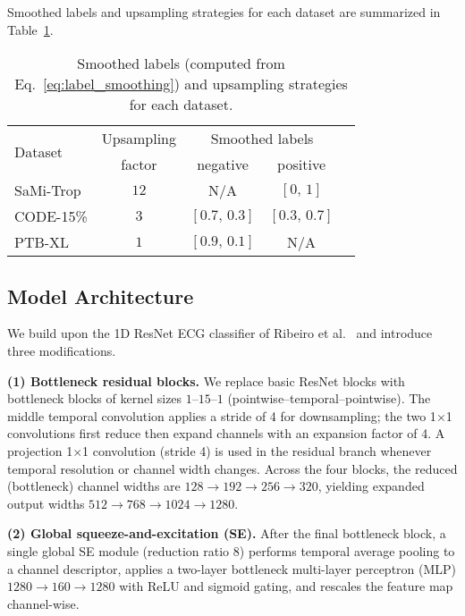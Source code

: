 \documentclass[twocolumn]{cinc}
\begin{document}
Smoothed labels and upsampling strategies for each dataset are summarized in Table~\ref{tab:augmentation}.


\begin{table}[!htp]
\centering
\begin{tabular}{lcccc}
\toprule
\multirow{2}{*}{Dataset} & Upsampling & \multicolumn{2}{c}{Smoothed labels} \\ \cmidrule(lr){3-4}
& factor & negative & positive \\
\midrule
SaMi-Trop & $12$ & N/A           & $[0,\,1]$     \\
CODE-15\% & $3$ & $[0.7,\,0.3]$ & $[0.3,\,0.7]$ \\
PTB-XL    & $1$ & $[0.9,\,0.1]$ & N/A           \\
\bottomrule
\end{tabular}
\caption{Smoothed labels (computed from Eq.~\ref{eq:label_smoothing}) and upsampling strategies for each dataset.}
\label{tab:augmentation}
\end{table}


\subsection{Model Architecture}
\label{subsec:model}


We build upon the 1D ResNet ECG classifier of Ribeiro et al.~\cite{ribeiro2020automatic} and introduce three modifications.

\textbf{(1) Bottleneck residual blocks.} We replace basic ResNet blocks with bottleneck blocks of kernel sizes $1$–$15$–$1$ (pointwise--temporal--pointwise). The middle temporal convolution applies a stride of 4 for downsampling; the two 1$\times$1 convolutions first reduce then expand channels with an expansion factor of 4. A projection 1$\times$1 convolution (stride 4) is used in the residual branch whenever temporal resolution or channel width changes. Across the four blocks, the reduced (bottleneck) channel widths are $128 \to 192 \to 256 \to 320$, yielding expanded output widths $512 \to 768 \to 1024 \to 1280$.

\textbf{(2) Global squeeze-and-excitation (SE).} After the final bottleneck block, a single global SE module (reduction ratio 8) \cite{hu2018senet} performs temporal average pooling to a channel descriptor, applies a two-layer bottleneck multi-layer perceptron (MLP) $1280 \to 160 \to 1280$ with ReLU and sigmoid gating, and rescales the feature map channel-wise.
\end{document}
